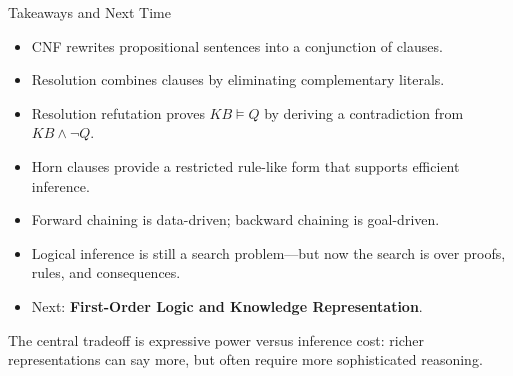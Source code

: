 \documentclass[aspectratio=169,10pt]{beamer}
\begin{document}
\begin{frame}[shrink=8]{Takeaways and Next Time}
  \begin{itemize}
    \item CNF rewrites propositional sentences into a conjunction of clauses.
    \item Resolution combines clauses by eliminating complementary literals.
    \item Resolution refutation proves $KB\models Q$ by deriving a contradiction from $KB\land\neg Q$.
    \item Horn clauses provide a restricted rule-like form that supports efficient inference.
    \item Forward chaining is data-driven; backward chaining is goal-driven.
    \item Logical inference is still a search problem---but now the search is over proofs, rules, and consequences.
    \item Next: \textbf{First-Order Logic and Knowledge Representation}.
  \end{itemize}

  \begin{keyidea}
    The central tradeoff is expressive power versus inference cost: richer representations can say more, but often require more sophisticated reasoning.
  \end{keyidea}
\end{frame}
\end{document}
